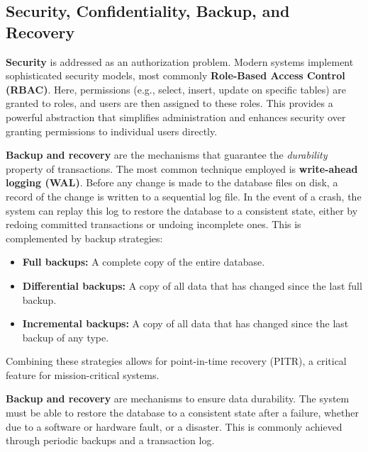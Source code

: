 \subsection{Security, Confidentiality, Backup, and Recovery}
\textbf{Security} is addressed as an authorization problem. Modern systems implement sophisticated security models, most commonly \textbf{Role-Based Access Control (RBAC)}. Here, permissions (e.g., select, insert, update on specific tables) are granted to roles, and users are then assigned to these roles. This provides a powerful abstraction that simplifies administration and enhances security over granting permissions to individual users directly.

\textbf{Backup and recovery} are the mechanisms that guarantee the \textit{durability} property of transactions. The most common technique employed is \textbf{write-ahead logging (WAL)}. Before any change is made to the database files on disk, a record of the change is written to a sequential log file. In the event of a crash, the system can replay this log to restore the database to a consistent state, either by redoing committed transactions or undoing incomplete ones. This is complemented by backup strategies:
\begin{itemize}
    \item \textbf{Full backups:} A complete copy of the entire database.
    \item \textbf{Differential backups:} A copy of all data that has changed since the last full backup.
    \item \textbf{Incremental backups:} A copy of all data that has changed since the last backup of any type.
\end{itemize}
Combining these strategies allows for point-in-time recovery (PITR), a critical feature for mission-critical systems.

\textbf{Backup and recovery} are mechanisms to ensure data durability. The system must be able to restore the database to a consistent state after a failure, whether due to a software or hardware fault, or a disaster. This is commonly achieved through periodic backups and a transaction log.

